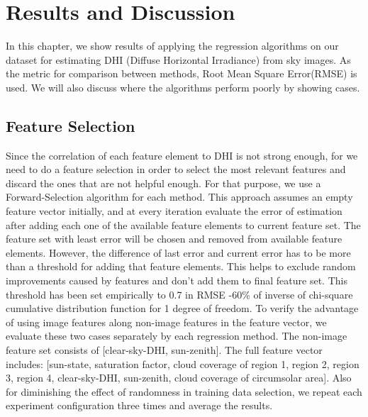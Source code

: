 \chapter{Results and Discussion}
\label{sec:result_chapter}
In this chapter, we show results of applying the regression algorithms on our dataset for estimating DHI (Diffuse Horizontal Irradiance) from sky images. As the metric for comparison between methods, Root Mean Square Error(RMSE) is used. We will also discuss where the algorithms perform poorly by showing cases.

\section{Feature Selection}
Since the correlation of each feature element to DHI is not strong enough, for we need to do a feature selection in order to select the most relevant features and discard the ones that are not helpful enough. For that purpose, we use a Forward-Selection algorithm for each method. This approach assumes an empty feature vector initially, and at every iteration evaluate the error of estimation after adding each one of the available feature elements to current feature set. The feature set with least error will be chosen and removed from available feature elements. However, the difference of last error and current error has to be more than a threshold for adding that feature elements. This helps to exclude random improvements caused by features and don't add them to final feature set. This threshold has been set empirically to 0.7 in RMSE -60\% of inverse of chi-square cumulative distribution function for 1 degree of freedom. 
\newline
To verify the advantage of using image features along non-image features in the feature vector, we evaluate these two cases separately by each regression method. The non-image feature set consists of [clear-sky-DHI, sun-zenith]. The full feature vector includes: [sun-state, saturation factor, cloud coverage of region 1, region 2, region 3, region 4, clear-sky-DHI, sun-zenith, cloud coverage of circumsolar area]. Also for diminishing the effect of randomness in training data selection, we repeat each experiment configuration three times and average the results.

